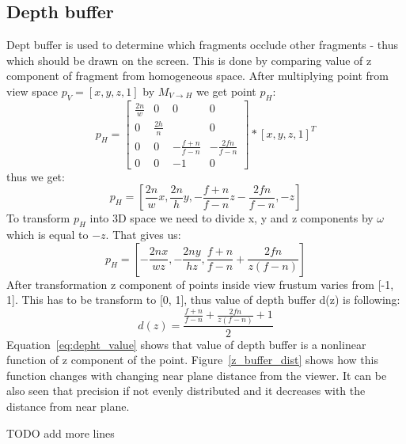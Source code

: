 \subsection{Depth buffer}
Dept buffer is used to determine which fragments occlude other fragments - thus which should be drawn on the screen. This is done by comparing value of z component of fragment from homogeneous space. 
After multiplying point from view space $p_V = [x, y, z, 1]$  by $M_{V \to H}$ we get point $p_H$:
\begin{equation}
\label{eg:projection_transformation}
p_H =
\begin{bmatrix}
\frac{2n}{w} & 0            & 0                & 0                \\ 
0            & \frac{2h}{n} &                  & 0                 \\ 
0            & 0            & -\frac{f+n}{f-n} & -\frac{2fn}{f-n} \\ 
0            & 0            & -1               & 0
\end{bmatrix}
*[x, y, z, 1]^T
\end{equation}
thus we get:
\begin{equation}
\label{eg:after_perspective_projection}
p_H = [\frac{2n}{w}x, \frac{2n}{h}y, -\frac{f+n}{f-n}z - \frac{2fn}{f-n}, -z]
\end{equation}
To transform $p_H$ into 3D space we need to divide x, y and z components by $\omega$ which is equal to $-z$. That gives us:
\begin{equation}
\label{eg:after_perspective_projection}
p_H = [-\frac{2nx}{wz},-\frac{2ny}{hz}, \frac{f+n}{f-n} + \frac{2fn}{z(f-n)}]
\end{equation}
After transformation z component of points inside view frustum varies from [-1, 1]. This has to be transform to [0, 1], thus value of depth buffer d(z) is following:
\begin{equation}
\label{eq:depth_value}
d(z) = \frac{\frac{f+n}{f-n} + \frac{2fn}{z(f-n)} + 1}{2}
\end{equation}
Equation~\ref{eq:depht_value} shows that value of depth buffer is a nonlinear function of z component of the point. Figure~\ref{z_buffer_dist} shows how this function changes with changing near plane distance from the viewer. It can be also seen that precision if not evenly distributed and it decreases with the distance from near plane. 

TODO add more lines

